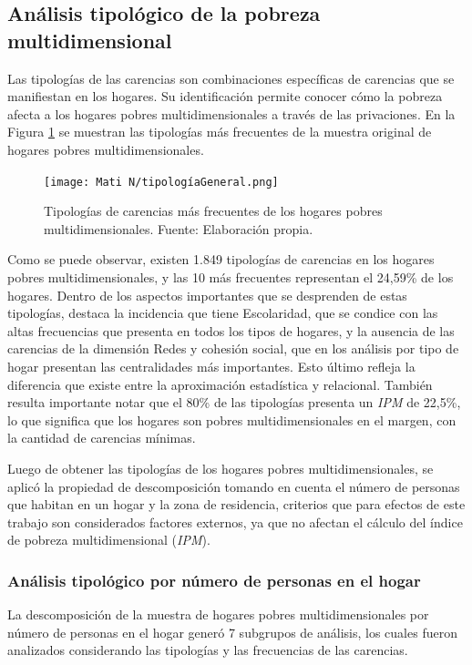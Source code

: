\documentclass[12pt,letterpaper,spanish]{article}
\begin{document}
\subsection{Análisis tipológico de la pobreza multidimensional}
Las tipologías de las carencias son combinaciones específicas de carencias que se manifiestan en los hogares. Su identificación permite conocer cómo la pobreza afecta a los hogares pobres multidimensionales a través de las privaciones. En la Figura \ref{TipGen} se muestran las tipologías más frecuentes de la muestra original de hogares pobres multidimensionales.
\begin{figure}[H]
    \centering
    \texttt{[image: Mati N/tipologíaGeneral.png]}
    \caption{Tipologías de carencias más frecuentes de los hogares pobres multidimensionales. Fuente: Elaboración propia.}
    \label{TipGen}
\end{figure}
Como se puede observar, existen 1.849 tipologías de carencias en los hogares pobres multidimensionales, y las 10 más frecuentes representan el 24,59\% de los hogares. Dentro de los aspectos importantes que se desprenden de estas tipologías, destaca la incidencia que tiene Escolaridad, que se condice con las altas frecuencias que presenta en todos los tipos de hogares, y la ausencia de las carencias de la dimensión Redes y cohesión social, que en los análisis por tipo de hogar presentan las centralidades más importantes. Esto último refleja la diferencia que existe entre la aproximación estadística y relacional. También resulta importante notar que el 80\% de las tipologías presenta un \textit{IPM} de 22,5\%, lo que significa que los hogares son pobres multidimensionales en el margen, con la cantidad de carencias mínimas.

Luego de obtener las tipologías de los hogares pobres multidimensionales, se aplicó la propiedad de descomposición tomando en cuenta el número de personas que habitan en un hogar y la zona de residencia, criterios que para efectos de este trabajo son considerados factores externos, ya que no afectan el cálculo del índice de pobreza multidimensional (\textit{IPM}).

\subsubsection{Análisis tipológico por número de personas en el hogar}
La descomposición de la muestra de hogares pobres multidimensionales por número de personas en el hogar generó 7 subgrupos de análisis, los cuales fueron analizados considerando las tipologías y las frecuencias de las carencias. 
\end{document}
